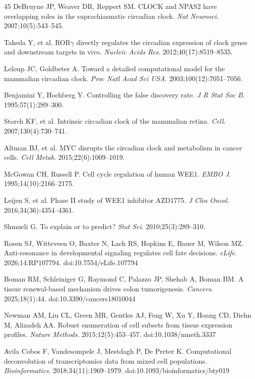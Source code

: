 \documentclass[11pt,letterpaper]{article}
\begin{document}
\begin{thebibliography}{45}
DeBruyne JP, Weaver DR, Reppert SM. CLOCK and NPAS2 have overlapping roles in the suprachiasmatic circadian clock. \textit{Nat Neurosci}. 2007;10(5):543--545.

Takeda Y, et al. ROR$\gamma$ directly regulates the circadian expression of clock genes and downstream targets in vivo. \textit{Nucleic Acids Res}. 2012;40(17):8519--8535.

Leloup JC, Goldbeter A. Toward a detailed computational model for the mammalian circadian clock. \textit{Proc Natl Acad Sci USA}. 2003;100(12):7051--7056.

Benjamini Y, Hochberg Y. Controlling the false discovery rate. \textit{J R Stat Soc B}. 1995;57(1):289--300.

Storch KF, et al. Intrinsic circadian clock of the mammalian retina. \textit{Cell}. 2007;130(4):730--741.

Altman BJ, et al. MYC disrupts the circadian clock and metabolism in cancer cells. \textit{Cell Metab}. 2015;22(6):1009--1019.

McGowan CH, Russell P. Cell cycle regulation of human WEE1. \textit{EMBO J}. 1995;14(10):2166--2175.

Leijen S, et al. Phase II study of WEE1 inhibitor AZD1775. \textit{J Clin Oncol}. 2016;34(36):4354--4361.

Shmueli G. To explain or to predict? \textit{Stat Sci}. 2010;25(3):289--310.

Rosen SJ, Witteveen O, Baxter N, Lach RS, Hopkins E, Bauer M, Wilson MZ. Anti-resonance in developmental signaling regulates cell fate decisions. \textit{eLife}. 2026;14:RP107794. doi:10.7554/eLife.107794

Boman RM, Schleiniger G, Raymond C, Palazzo JP, Shehab A, Boman BM. A tissue renewal-based mechanism drives colon tumorigenesis. \textit{Cancers}. 2025;18(1):44. doi:10.3390/cancers18010044

Newman AM, Liu CL, Green MR, Gentles AJ, Feng W, Xu Y, Hoang CD, Diehn M, Alizadeh AA. Robust enumeration of cell subsets from tissue expression profiles. \textit{Nature Methods}. 2015;12(5):453--457. doi:10.1038/nmeth.3337

Avila Cobos F, Vandesompele J, Mestdagh P, De Preter K. Computational deconvolution of transcriptomics data from mixed cell populations. \textit{Bioinformatics}. 2018;34(11):1969--1979. doi:10.1093/bioinformatics/bty019


\end{thebibliography}
\end{document}
